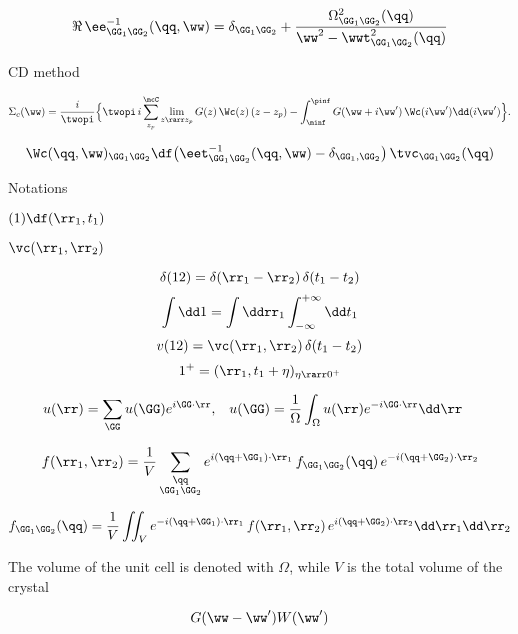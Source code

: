 \documentclass[a4paper,reqno,11pt,twoside]{book}
\begin{document}
\begin{equation}
\label{eq:ppmodel_real}
\Re\,\ee^{-1}_{\GG_1 \GG_2} (\qq,\ww) = 
\delta_{\GG_1 \GG_2} + \dfrac{\Omega_{\GG_1\GG_2}^2(\qq)}{\ww^2-\wwt^2_{\GG_1\GG_2}(\qq)}
\end{equation}


 CD method

\begin{multline}
\label{eq:GW_CD}
\Sigma_c(\ww) = \dfrac{i}{\twopi} \Bigl\{ 
 \twopi\,i \sum_{z_p}^\mcC \lim_{z\rarr z_p} G(z)\,\Wc(z)\,(z-z_p) -\int_\minf^\pinf G(\ww+i\ww')\,\Wc(i\ww') \dd(i\ww')
 \Bigr\}.
\end{multline}

\begin{equation}
\Wc(\qq,\ww)_{\GG_1\GG_2} \df 
\bigl(\eet^{-1}_{\GG_1\GG_2}(\qq,\ww) -\delta_{\GG_1,\GG_2}\bigr)
\,\tvc_{\GG_1\GG_2}(\qq)
\end{equation}


Notations

$(1) \df (\rr_1,t_1)$ 

$\vc(\rr_1,\rr_2)$ 

\begin{equation}
\delta(12) = \delta(\rr_1-\rr_2)\,\delta(t_1-t_2)
\end{equation}
%
\begin{equation}
\int \dd1 = \int \ddrr_1 \int_{-\infty}^{+\infty} \dd t_1
\end{equation}
%
\begin{equation}
v(12)= \vc(\rr_1,\rr_2)\,\delta(t_1-t_2)
\end{equation}
%
\begin{equation}
1^+ = (\rr_1,t_1 + \eta)_{\eta  \rarr 0^+}
\end{equation}

\begin{alignat}{2}\label{eq:FT_1point_convention}
 u(\rr)= \sum_\GG u(\GG)e^{i\GG\cdot\rr}, &\quad
 u(\GG) = \frac{1}{\Omega} \int_\Omega u(\rr)e^{-i\GG\cdot\rr}\dd\rr
\end{alignat}


\begin{equation}\label{eq:IFT_2points_convention}
 f(\rr_1,\rr_2)= \frac{1}{V} \sum_{\substack{\qq \\ \GG_1 \GG_2}}  
 e^{i (\qq +\GG_1) \cdot \rr_1}\,f_{\GG_1 \GG_2}(\qq)\,e^{-i (\qq+\GG_2) \cdot \rr_2} 
\end{equation}

\begin{equation}\label{eq:FT_2points_convention}
 f_{\GG_1\GG_2}(\qq) = \frac{1}{V} \iint_V                                                     
 e^{-i(\qq+\GG_1) \cdot \rr_1}\,f(\rr_1, \rr_2)\,e^{i (\qq+\GG_2) \cdot \rr_2}\dd\rr_1\dd\rr_2 
\end{equation}

The volume of the unit cell is denoted with $\Omega$, while $V$ is the total volume of the crystal 

\begin{equation}\label{eq:Poles of G and W}
 G(\ww-\ww')  
 W(\ww')
\end{equation}
\end{document}
